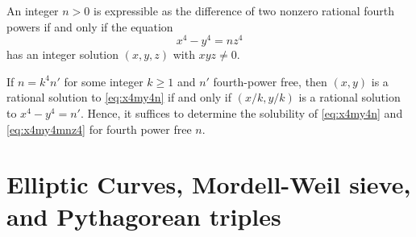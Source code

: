 \documentclass[a4paper,12pt,english,reqno]{amsart}
\begin{document}
An integer $n>0$ is expressible as the difference of two nonzero rational fourth powers if and only if the equation
	\begin{equation}\label{eq:x4my4mnz4}
		x^4-y^4=nz^4
	\end{equation} 
 has an integer solution $(x,y,z)$ with $xyz \neq 0$. 
 
 If $n=k^4 n'$ for some integer $k\geq 1$ and $n'$ fourth-power free, then $(x,y)$ is a rational solution to \eqref{eq:x4my4n} if and only if $(x/k,y/k)$ is a rational solution to $x^4-y^4=n'$. Hence, it suffices to determine the solubility of \eqref{eq:x4my4n} and \eqref{eq:x4my4mnz4} for fourth power free $n$. 
 





\section{Elliptic Curves, Mordell-Weil sieve, and Pythagorean triples }\label{sec:methods}
\end{document}
